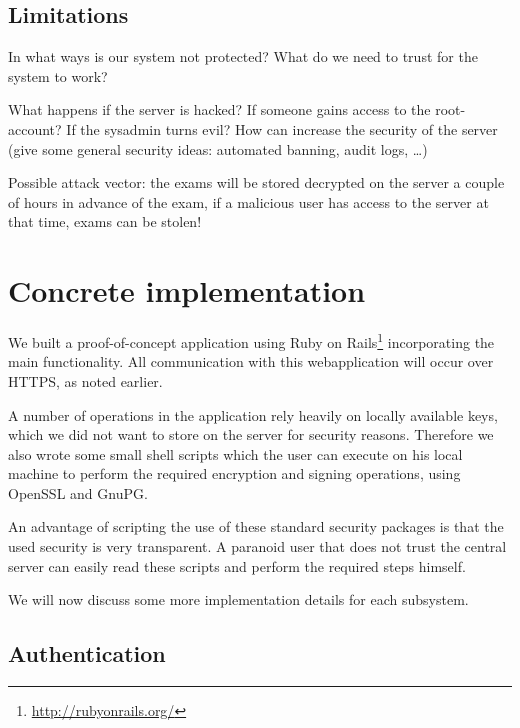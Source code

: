 \documentclass[12pt]{article}
\begin{document}
\subsection{Limitations}
\label{subsec:req-limitations}


In what ways is our system not protected? What do we need to trust for the
system to work?

What happens if the server is hacked? If someone gains access to the
root-account? If the sysadmin turns evil? How can increase the security of the
server (give some general security ideas: automated banning, audit logs, \dots)

Possible attack vector: the exams will be stored decrypted on the server a
couple of hours in advance of the exam, if a malicious user has access to the
server at that time, exams can be stolen!

\section{Concrete implementation}
\label{sec:implementation}


We built a proof-of-concept application using Ruby on
Rails\footnote{\url{http://rubyonrails.org/}} incorporating the main
functionality. All communication with this webapplication will occur over HTTPS,
as noted earlier.

A number of operations in the application rely heavily on locally available
keys, which we did not want to store on the server for security reasons.
Therefore we also wrote some small shell scripts which the user can execute on
his local machine to perform the required encryption and signing operations,
using OpenSSL and GnuPG.

An advantage of scripting the use of these standard security packages is that
the used security is very transparent. A paranoid user that does not trust the
central server can easily read these scripts and perform the required steps
himself.

We will now discuss some more implementation details for each subsystem.

\subsection{Authentication}
\label{subsec:impl-authentication}
\end{document}
